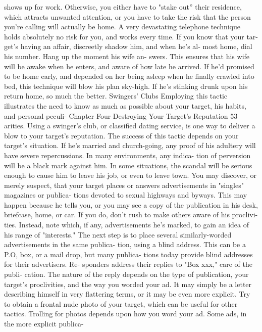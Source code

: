 \documentclass{book}
\begin{document}
shows up for work. Otherwise, you either have to "stake out” 
their residence, which attracts unwanted attention, or you have 
to take the risk that the person you're calling will actually be 
home. 
A very devastating telephone technique holds absolutely no 
risk for you, and works every time. If you know that your tar- 
get's having an affair, discreetly shadow him, and when he's al- 
most home, dial his number. Hang up the moment his wife an- 
swers. This ensures that his wife will be awake when he enters, 
and aware of how late he arrived. If he'd promised to be home 
early, and depended on her being asleep when he finally 
crawled into bed, this technique will blow his plan sky-high. If 
he's stinking drunk upon his return home, so much the better. 
Swingers’ Clubs 
Employing this tactic illustrates the need to know as much 
as possible about your target, his habits, and personal peculi- 
Chapter Four 
Destroying Your Target's Reputation 
53 
arities. Using a swinger's club, or classified dating service, is 
one way to deliver a blow to your target's reputation. 
The success of this tactic depends on your target's situation. 
If he's married and church-going, any proof of his adultery will 
have severe repercussions. In many environments, any indica- 
tion of perversion will be a black mark against him. In some 
situations, the scandal will be serious enough to cause him to 
leave his job, or even to leave town. 
You may discover, or merely suspect, that your target places 
or answers advertisements in "singles" magazines or publica- 
tions devoted to sexual highways and byways. This may happen 
because he tells you, or you may see a copy of the publication 
in his desk, briefcase, home, or car. 
If you do, don't rush to make others aware of his proclivi- 
ties. Instead, note which, if any, advertisements he's marked, to 
gain an idea of his range of "interests." The next step is to place 
several similarly-worded advertisements in the same publica- 
tion, using a blind address. 
This can be a P.O, box, or a mail drop, but many publica- 
tions today provide blind addresses for their advertisers. Re- 
sponders address their replies to "Box xxx," care of the publi- 
cation. 
The nature of the reply depends on the type of publication, 
your target's proclivities, and the way you worded your ad. It 
may simply be a letter describing himself in very flattering 
terms, or it may be even more explicit. 
Try to obtain a frontal nude photo of your target, which can 
be useful for other tactics. Trolling for photos depends upon 
how you word your ad. Some ads, in the more explicit publica- 
\end{document}
